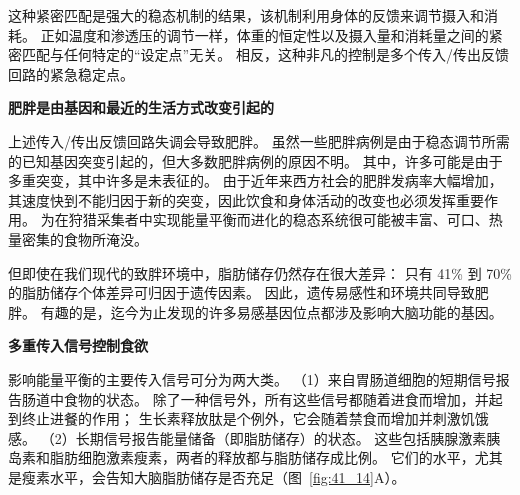 这种紧密匹配是强大的稳态机制的结果，该机制利用身体的反馈来调节摄入和消耗。
正如温度和渗透压的调节一样，体重的恒定性以及摄入量和消耗量之间的紧密匹配与任何特定的“设定点”无关。
相反，这种非凡的控制是多个传入/传出反馈回路的紧急稳定点。


\textbf{肥胖是由基因和最近的生活方式改变引起的}

上述传入/传出反馈回路失调会导致肥胖。
虽然一些肥胖病例是由于稳态调节所需的已知基因突变引起的，但大多数肥胖病例的原因不明。
其中，许多可能是由于多重突变，其中许多是未表征的。
由于近年来西方社会的肥胖发病率大幅增加，其速度快到不能归因于新的突变，因此饮食和身体活动的改变也必须发挥重要作用。
为在狩猎采集者中实现能量平衡而进化的稳态系统很可能被丰富、可口、热量密集的食物所淹没。


但即使在我们现代的致胖环境中，脂肪储存仍然存在很大差异：
只有 41\% 到 70\% 的脂肪储存个体差异可归因于遗传因素。
因此，遗传易感性和环境共同导致肥胖。
有趣的是，迄今为止发现的许多易感基因位点都涉及影响大脑功能的基因。


\textbf{多重传入信号控制食欲}

影响能量平衡的主要传入信号可分为两大类。
（1）来自胃肠道细胞的短期信号报告肠道中食物的状态。
除了一种信号外，所有这些信号都随着进食而增加，并起到终止进餐的作用；
生长素释放肽是个例外，它会随着禁食而增加并刺激饥饿感。
（2）长期信号报告能量储备（即脂肪储存）的状态。 
这些包括胰腺激素胰岛素和脂肪细胞激素瘦素，两者的释放都与脂肪储存成比例。
它们的水平，尤其是瘦素水平，会告知大脑脂肪储存是否充足（图~\ref{fig:41_14}A）。


